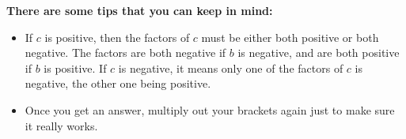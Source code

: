         \label{m39394*id276779}
          \textbf{There are some tips that you can keep in mind:}
        \par 
        \label{m39394*id276789}\begin{itemize}[noitemsep]
            \label{m39394*uid27}\item If $c$ is positive, then the factors of $c$ must be either both positive or both negative. The factors are both negative if $b$ is negative, and are both positive if $b$ is positive. If $c$ is negative, it means only one of the factors of $c$ is negative, the other one being positive.
\label{m39394*uid28}\item Once you get an answer, multiply out your brackets again just to make sure it really works.
\end{itemize}
\par
            \label{m39394*secfhsst!!!underscore!!!id2510}\vspace{.5cm} 
      \noindent
